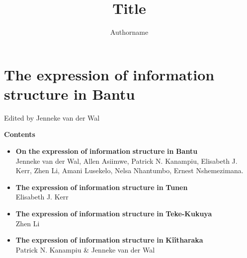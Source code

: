 \documentclass[output=paper]{langscibook}
\author{Authorname\orcid{}\affiliation{}}
\title{Title}
\begin{document}
\maketitle 

\section{\textbf{The} \textbf{expression} \textbf{of} \textbf{information} \textbf{structure} \textbf{in} \textbf{Bantu}}

Edited by Jenneke van der Wal

\textbf{Contents}

\begin{itemize}
\item \begin{styleListParagraph}
\textbf{On} \textbf{the} \textbf{expression} \textbf{of} \textbf{information} \textbf{structure} \textbf{in} \textbf{Bantu\\
}Jenneke van der Wal, Allen Asiimwe, Patrick N. Kanampiu, Elisabeth J. Kerr, Zhen Li, Amani Lusekelo, Nelsa Nhantumbo, Ernest Nshemezimana.
\end{styleListParagraph}
\end{itemize}
\begin{itemize}
\item \begin{styleListParagraph}
\textbf{The} \textbf{expression} \textbf{of} \textbf{information} \textbf{structure} \textbf{in} \textbf{Tunen\\
}Elisabeth J. Kerr
\end{styleListParagraph}
\end{itemize}
\begin{itemize}
\item \begin{styleListParagraph}
\textbf{The} \textbf{expression} \textbf{of} \textbf{information} \textbf{structure} \textbf{in} \textbf{Teke-Kukuya\\
}Zhen Li
\end{styleListParagraph}
\end{itemize}
\begin{itemize}
\item \begin{styleListParagraph}
\textbf{The} \textbf{expression} \textbf{of} \textbf{information} \textbf{structure} \textbf{in} \textbf{Kîîtharaka\\
}Patrick N. Kanampiu \& Jenneke van der Wal
\end{styleListParagraph}
\end{itemize}
\end{document}
